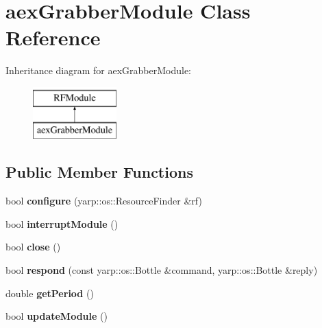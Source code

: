 \hypertarget{classaexGrabberModule}{}\section{aex\+Grabber\+Module Class Reference}
\label{classaexGrabberModule}
Inheritance diagram for aex\+Grabber\+Module\+:\begin{figure}[H]
\begin{center}
\leavevmode
\includegraphics[height=2.000000cm]{classaexGrabberModule}
\end{center}
\end{figure}
\subsection*{Public Member Functions}
\begin{DoxyCompactItemize}
\item 
bool {\bfseries configure} (yarp\+::os\+::\+Resource\+Finder \&rf)\hypertarget{classaexGrabberModule_a7654bd490ccdd31ffc5de4e5d85789f3}{}\label{classaexGrabberModule_a7654bd490ccdd31ffc5de4e5d85789f3}

\item 
bool {\bfseries interrupt\+Module} ()\hypertarget{classaexGrabberModule_a349f07e43758979d9f7e520dd25ba868}{}\label{classaexGrabberModule_a349f07e43758979d9f7e520dd25ba868}

\item 
bool {\bfseries close} ()\hypertarget{classaexGrabberModule_ac032595742ec7bfdd3d6788436572aca}{}\label{classaexGrabberModule_ac032595742ec7bfdd3d6788436572aca}

\item 
bool {\bfseries respond} (const yarp\+::os\+::\+Bottle \&command, yarp\+::os\+::\+Bottle \&reply)\hypertarget{classaexGrabberModule_a18cadf0f324c5dbb7a8d9acfb767ffc0}{}\label{classaexGrabberModule_a18cadf0f324c5dbb7a8d9acfb767ffc0}

\item 
double {\bfseries get\+Period} ()\hypertarget{classaexGrabberModule_a06d7548efce14fbb37945f5640ca029a}{}\label{classaexGrabberModule_a06d7548efce14fbb37945f5640ca029a}

\item 
bool {\bfseries update\+Module} ()\hypertarget{classaexGrabberModule_ae08d72931d6f5283092228dab867d92e}{}\label{classaexGrabberModule_ae08d72931d6f5283092228dab867d92e}

\end{DoxyCompactItemize}


